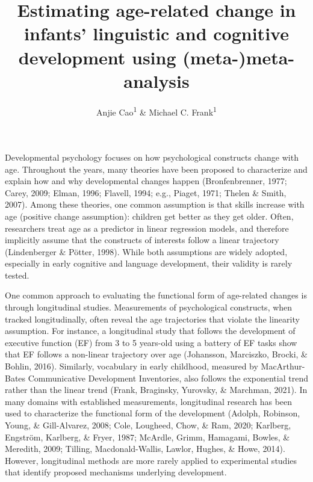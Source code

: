 \documentclass[
  man]{apa6}
\title{Estimating age-related change in infants' linguistic and cognitive development using (meta-)meta-analysis}
\author{Anjie Cao\textsuperscript{1} \& Michael C. Frank\textsuperscript{1}}
\date{}
\affiliation{\vspace{0.5cm}\textsuperscript{1} Stanford University\\\textsuperscript{2} Konstanz Business School}
\begin{document}
\maketitle

Developmental psychology focuses on how psychological constructs change with age. Throughout the years, many theories have been proposed to characterize and explain how and why developmental changes happen (Bronfenbrenner, 1977; Carey, 2009; Elman, 1996; Flavell, 1994; e.g., Piaget, 1971; Thelen \& Smith, 2007). Among these theories, one common assumption is that skills increase with age (positive change assumption): children get better as they get older. Often, researchers treat age as a predictor in linear regression models, and therefore implicitly assume that the constructs of interests follow a linear trajectory (Lindenberger \& Pötter, 1998). While both assumptions are widely adopted, especially in early cognitive and language development, their validity is rarely tested.

One common approach to evaluating the functional form of age-related changes is through longitudinal studies. Measurements of psychological constructs, when tracked longitudinally, often reveal the age trajectories that violate the linearity assumption. For instance, a longitudinal study that follows the development of executive function (EF) from 3 to 5 years-old using a battery of EF tasks show that EF follows a non-linear trajectory over age (Johansson, Marciszko, Brocki, \& Bohlin, 2016). Similarly, vocabulary in early childhood, measured by MacArthur-Bates Communicative Development Inventories, also follows the exponential trend rather than the linear trend (Frank, Braginsky, Yurovsky, \& Marchman, 2021). In many domains with established measurements, longitudinal research has been used to characterize the functional form of the development (Adolph, Robinson, Young, \& Gill-Alvarez, 2008; Cole, Lougheed, Chow, \& Ram, 2020; Karlberg, Engström, Karlberg, \& Fryer, 1987; McArdle, Grimm, Hamagami, Bowles, \& Meredith, 2009; Tilling, Macdonald-Wallis, Lawlor, Hughes, \& Howe, 2014). However, longitudinal methods are more rarely applied to experimental studies that identify proposed mechanisms underlying development.
\end{document}
